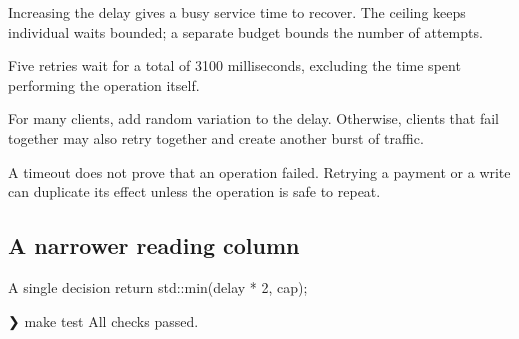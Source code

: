 \documentclass[10pt]{article}
\begin{document}
\begin{explanation}
Increasing the delay gives a busy service time to recover. The ceiling keeps
individual waits bounded; a separate budget bounds the number of attempts.

Five retries wait for a total of 3100 milliseconds, excluding the time spent
performing the operation itself.
\end{explanation}

\begin{advice}
For many clients, add random variation to the delay. Otherwise, clients that
fail together may also retry together and create another burst of traffic.
\end{advice}

\begin{warning}
A timeout does not prove that an operation failed. Retrying a payment or a write
can duplicate its effect unless the operation is safe to repeat.
\end{warning}

\subsection*{A narrower reading column}
\begin{minipage}{0.66\linewidth}
\begin{cpp}[listingopts={numbers=none}]{A single decision}
return std::min(delay * 2, cap);
\end{cpp}
\begin{terminal}[title={Run the checks}]
❯ make test
All checks passed.
\end{terminal}
\end{minipage}
\end{document}
